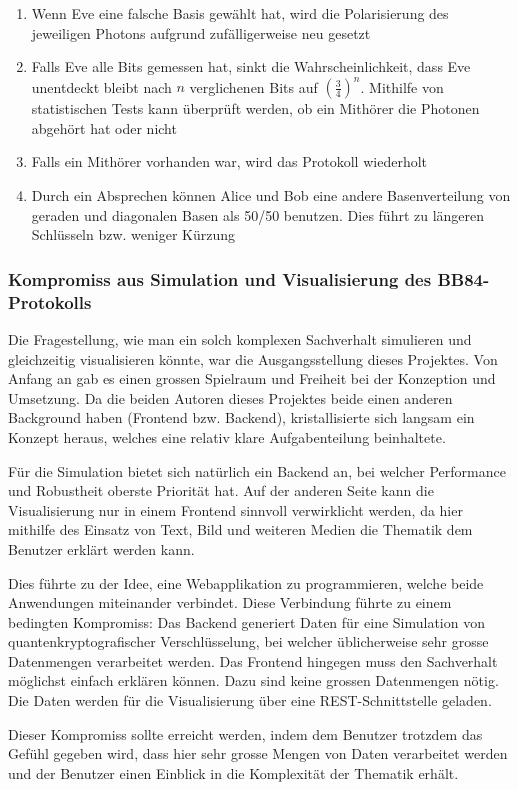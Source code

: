 \documentclass[a4paper,10.2pt,pdftex]{scrartcl}%
\begin{document}
\begin{enumerate}
\item  Wenn Eve eine falsche Basis gewählt hat, wird die Polarisierung des jeweiligen Photons aufgrund zufälligerweise neu gesetzt
\item  Falls Eve alle Bits gemessen hat, sinkt die Wahrscheinlichkeit, dass Eve unentdeckt bleibt nach $n$ verglichenen Bits auf $(\frac{3}{4})^n$. Mithilfe von statistischen Tests kann überprüft werden, ob ein Mithörer die Photonen abgehört hat oder nicht
\item  Falls ein Mithörer vorhanden war, wird das Protokoll wiederholt
\item  Durch ein Absprechen können Alice und Bob eine andere Basenverteilung von geraden und diagonalen Basen als 50/50 benutzen. Dies führt zu längeren Schlüsseln bzw. weniger Kürzung
\end{enumerate}

\subsubsection{Kompromiss aus Simulation und Visualisierung des BB84-Protokolls}
Die Fragestellung, wie man ein solch komplexen Sachverhalt simulieren und gleichzeitig visualisieren könnte, war die Ausgangsstellung dieses Projektes. Von Anfang an gab es einen grossen Spielraum und Freiheit bei der Konzeption und Umsetzung. Da die beiden Autoren dieses Projektes beide einen anderen Background haben (Frontend bzw. Backend), kristallisierte sich langsam ein Konzept heraus, welches eine relativ klare Aufgabenteilung beinhaltete.

Für die Simulation bietet sich natürlich ein Backend an, bei welcher Performance und Robustheit oberste Priorität hat. Auf der anderen Seite kann die Visualisierung nur in einem Frontend sinnvoll verwirklicht werden, da hier mithilfe des Einsatz von Text, Bild und weiteren Medien die Thematik dem Benutzer erklärt werden kann.

Dies führte zu der Idee, eine Webapplikation zu programmieren, welche beide Anwendungen miteinander verbindet. Diese Verbindung führte zu einem bedingten Kompromiss: Das Backend generiert Daten für eine Simulation von quantenkryptografischer Verschlüsselung, bei welcher üblicherweise sehr grosse Datenmengen verarbeitet werden. Das Frontend hingegen muss den Sachverhalt möglichst einfach erklären können. Dazu sind keine grossen Datenmengen nötig. Die Daten werden für die Visualisierung über eine REST-Schnittstelle geladen. 

Dieser Kompromiss sollte erreicht werden, indem dem Benutzer trotzdem das Gefühl gegeben wird, dass hier sehr grosse Mengen von Daten verarbeitet werden und der Benutzer einen Einblick in die Komplexität der Thematik erhält. 
 
\end{document}
